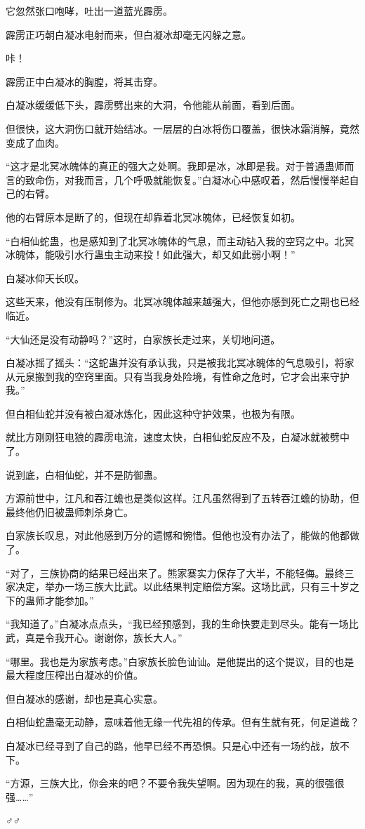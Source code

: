 \begin{this_body}
它忽然张口咆哮，吐出一道蓝光霹雳。

霹雳正巧朝白凝冰电射而来，但白凝冰却毫无闪躲之意。

咔！

霹雳正中白凝冰的胸膛，将其击穿。

白凝冰缓缓低下头，霹雳劈出来的大洞，令他能从前面，看到后面。

但很快，这大洞伤口就开始结冰。一层层的白冰将伤口覆盖，很快冰霜消解，竟然变成了血肉。

“这才是北冥冰魄体的真正的强大之处啊。我即是冰，冰即是我。对于普通蛊师而言的致命伤，对我而言，几个呼吸就能恢复。”白凝冰心中感叹着，然后慢慢举起自己的右臂。

他的右臂原本是断了的，但现在却靠着北冥冰魄体，已经恢复如初。

“白相仙蛇蛊，也是感知到了北冥冰魄体的气息，而主动钻入我的空窍之中。北冥冰魄体，能吸引水行蛊虫主动来投！如此强大，却又如此弱小啊！”

白凝冰仰天长叹。

这些天来，他没有压制修为。北冥冰魄体越来越强大，但他亦感到死亡之期也已经临近。

“大仙还是没有动静吗？”这时，白家族长走过来，关切地问道。

白凝冰摇了摇头：“这蛇蛊并没有承认我，只是被我北冥冰魄体的气息吸引，将家从元泉搬到我的空窍里面。只有当我身处险境，有性命之危时，它才会出来守护我。”

但白相仙蛇并没有被白凝冰炼化，因此这种守护效果，也极为有限。

就比方刚刚狂电狼的霹雳电流，速度太快，白相仙蛇反应不及，白凝冰就被劈中了。

说到底，白相仙蛇，并不是防御蛊。

方源前世中，江凡和吞江蟾也是类似这样。江凡虽然得到了五转吞江蟾的协助，但最终他仍旧被蛊师刺杀身亡。

白家族长叹息，对此他感到万分的遗憾和惋惜。但他也没有办法了，能做的他都做了。

“对了，三族协商的结果已经出来了。熊家寨实力保存了大半，不能轻侮。最终三家决定，举办一场三族大比武。以此结果判定赔偿方案。这场比武，只有三十岁之下的蛊师才能参加。”

“我知道了。”白凝冰点点头，“我已经预感到，我的生命快要走到尽头。能有一场比武，真是令我开心。谢谢你，族长大人。”

“哪里。我也是为家族考虑。”白家族长脸色讪讪。是他提出的这个提议，目的也是最大程度压榨出白凝冰的价值。

但白凝冰的感谢，却也是真心实意。

白相仙蛇蛊毫无动静，意味着他无缘一代先祖的传承。但有生就有死，何足道哉？

白凝冰已经寻到了自己的路，他早已经不再恐惧。只是心中还有一场约战，放不下。

“方源，三族大比，你会来的吧？不要令我失望啊。因为现在的我，真的很强很强……”

♂♂

\end{this_body}

